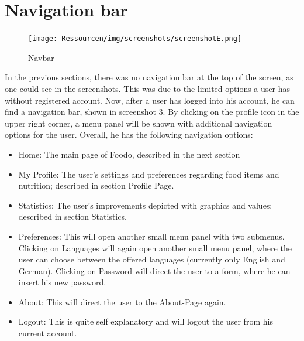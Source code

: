 \section*{Navigation bar}
\vspace{-2em}
\begin{figure}[H]
	\captionsetup{justification=centering}
	\begin{center}
		\texttt{[image: Ressourcen/img/screenshots/screenshotE.png]}
		\vspace{-3em}
		\caption{Navbar}
	\end{center}
\end{figure}
In the previous sections, there was no navigation bar at the top of the screen, as one could see in the screenshots. This was due to the limited options a user has without registered account. Now, after a user has logged into his account, he can find a navigation bar, shown in screenshot 3. By clicking on the profile icon in the upper right corner, a menu panel will be shown with additional navigation options for the user. Overall, he has the following navigation options:
\begin{itemize}
\item Home: The main page of Foodo, described in the next section
\item My Profile: The user's settings and preferences regarding food items and nutrition; described in section Profile Page.
\item Statistics: The user's improvements depicted with graphics and values; described in section Statistics.
\item Preferences: This will open another small menu panel with two submenus. Clicking on Languages will again open another small menu panel, where the user can choose between the offered languages (currently only English and German). Clicking on Password will direct the user to a form, where he can insert his new password.
\item About: This will direct the user to the About-Page again.
\item Logout: This is quite self explanatory and will logout the user from his current account.
\end{itemize}
